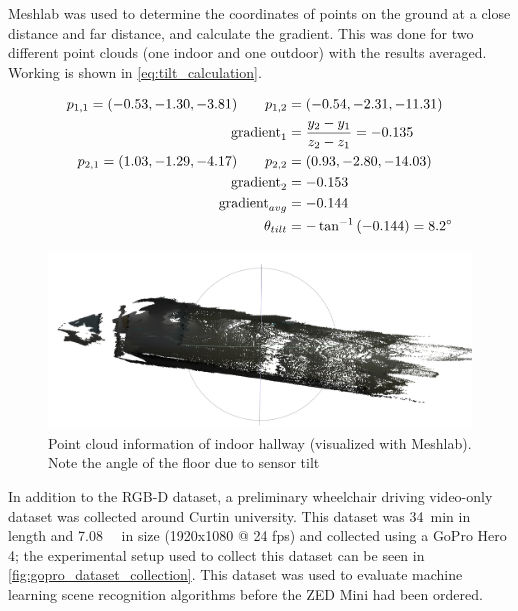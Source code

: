 Meshlab was used to determine the coordinates of points
on the ground at a close distance and far distance, and calculate the gradient.
This was done for two different point clouds (one indoor and one outdoor)
with the results averaged. Working is shown in \cref{eq:tilt_calculation}.

\begin{equation}
\begin{split}
p_{1,1} = (-0.53, -1.30, -3.81) \qquad p_{1,2} &= (-0.54, -2.31, -11.31)\\
\textrm{gradient}_1 &= \frac{y_2 - y_1}{z_2 - z_1} = -0.135\\
p_{2,1} = (1.03, -1.29, -4.17) \qquad p_{2,2} &= (0.93, -2.80, -14.03)\\
\textrm{gradient}_2 &= -0.153\\
\textrm{gradient}_{avg} &= -0.144\\
\theta_{tilt} &= -\tan^{-1}\left(-0.144\right) = 8.2\degree
\end{split}
\label{eq:tilt_calculation}
\end{equation}

\begin{figure}[b]
    \centering
    \includegraphics[width=0.8\linewidth]{images/meshlab_point_cloud.png}
    \caption{Point cloud information of indoor hallway (visualized with Meshlab). Note the angle of the floor due to sensor tilt}
    \label{fig:meshlab_point_cloud}
\end{figure}

In addition to the RGB-D dataset, a preliminary wheelchair driving video-only dataset was collected around
Curtin university.
This dataset was \SI{34}{\minute} in length and \SI{7.08}{\giga\byte} in size (1920x1080 @ 24 fps)
and collected using a GoPro Hero 4; the experimental setup used to collect this
dataset can be seen in \cref{fig:gopro_dataset_collection}.
This dataset was used to evaluate machine learning scene recognition algorithms
before the ZED Mini had been ordered.

